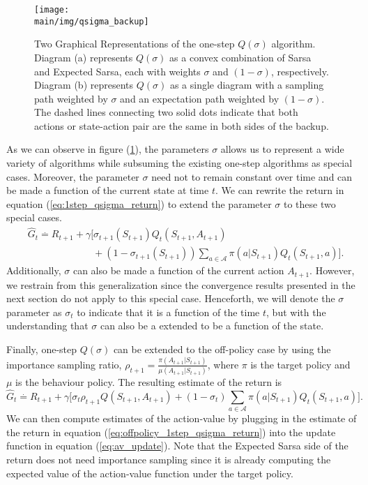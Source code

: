 \begin{figure}
    \centering
    \texttt{[image: \\main/img/qsigma\_backup]}
    \caption[One-Step Q(Sigma) Backup Diagram] {
    Two Graphical Representations of the one-step $Q(\sigma)$ algorithm. 
    Diagram (a) represents $Q(\sigma)$ as a convex combination of Sarsa and Expected Sarsa, each
    with weights $\sigma$ and $(1-\sigma)$, respectively.
    Diagram (b) represents $Q(\sigma)$ as a single diagram with a sampling path weighted by $\sigma$
    and an expectation path weighted by $(1-\sigma)$.
    The dashed lines connecting two solid dots indicate that both actions or state-action pair are
    the same in both sides of the backup.
    }
    \label{fig:qsigma_backup}
\end{figure}

As we can observe in figure (\ref{fig:qsigma_backup}), the parameters $\sigma$ allows us to represent a wide variety of algorithms while subsuming the existing one-step algorithms as special cases.
Moreover, the parameter $\sigma$ need not to remain constant over time and can be made a function of the current state at time $t$.
We can rewrite the return in equation (\ref{eq:1step_qsigma_return}) to extend the parameter $\sigma$ to these two special cases.
%
\begin{align}
& \hat{G}_t \overset{.}{=} R_{t+1} + \gamma \big[ \sigma_{t+1}(S_{t+1}) Q_t(S_{t+1}, A_{t+1}) 
	\nonumber \\
& \hspace{80pt} 
	+ (1-\sigma_{t+1}(S_{t+1})) \sum_{a \in \mathcal{A}} \pi(a|S_{t+1}) Q_t(S_{t+1}, a) \big].
\end{align}
%
Additionally, $\sigma$ can also be made a function of the current action $A_{t+1}$.
However, we restrain from this generalization since the convergence results presented in the next section do not apply to this special case.
Henceforth, we will denote the $\sigma$ parameter as $\sigma_t$ to indicate that it is a function of the time $t$, but with the understanding that $\sigma$ can also be a extended to be a function of the state.

Finally, one-step $Q(\sigma)$ can be extended to the off-policy case by using the importance sampling ratio, $\rho_{t+1} = \frac{\pi(A_{t+1}|S_{t+1})}{\mu(A_{t+1}|S_{t+1})}$, where $\pi$  is the target policy and  $\mu$ is the behaviour policy.
The resulting estimate of the return is
%
\begin{equation}
\label{eq:offpolicy_1step_qsigma_return}
\hat{G}_t \overset{.}{=} R_{t+1} + \gamma \big[\sigma_t \rho_{t+1} Q(S_{t+1}, A_{t+1}) 
	+ (1-\sigma_t) \sum_{a \in \mathcal{A}} \pi(a|S_{t+1}) Q_{t}(S_{t+1}, a) \big].
\end{equation}
%
We can then compute estimates of the action-value by plugging in the estimate of the return in equation (\ref{eq:offpolicy_1step_qsigma_return}) into the update function in equation (\ref{eq:av_update}).
Note that the Expected Sarsa side of the return does not need importance sampling since it is already computing the expected value of the action-value function under the target policy.


